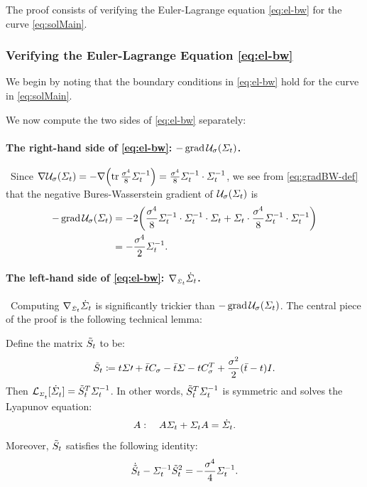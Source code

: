 The proof consists of verifying the Euler-Lagrange equation \eqref{eq:el-bw} for the curve \eqref{eq:solMain}.

\subsubsection{Verifying the Euler-Lagrange Equation \eqref{eq:el-bw}}
\label{sec:verifyEL}
We begin by noting that the boundary conditions in \eqref{eq:el-bw} hold for the curve in \eqref{eq:solMain}. 


We now compute the two sides of \eqref{eq:el-bw} separately:

\paragraph{The right-hand side of \eqref{eq:el-bw}: $-\gradBW\penergyBW$.}
~Since $\nabla \penergyBW = -\nabla \parens*{\tr \frac{\sdev^4}{8} \Sigcurveinv} =  \frac{\sdev^4}{8} \Sigcurveinv\cdot \Sigcurveinv$, we see from \eqref{eq:gradBW-def} that the negative Bures-Wasserstein gradient of $\penergyBW$ is
\begin{align}
\nn
-\gradBW \penergyBW &= -2\parens*{\frac{\sdev^4}{8} \Sigcurveinv\cdot \Sigcurveinv \cdot \Sigcurve + \Sigcurve\cdot \frac{\sdev^4}{8} \Sigcurveinv\cdot \Sigcurveinv } \\
\label{eq:gradBWU}
&= -\frac{\sdev^4}{2} \Sigcurveinv.
\end{align}


\paragraph{The left-hand side of \eqref{eq:el-bw}: $\nabla_{\scriptscriptstyle\dot{\Sigma}_{t}}\dot{\Sigma}_{t}$.}
~Computing $\nabla_{\scriptscriptstyle\dot{\Sigma}_{t}}\dot{\Sigma}_{t}$ is significantly trickier than $-\gradBW\penergyBW$. The central piece of the proof is the following technical lemma:
\begin{lemma}
\label{lem:lyap}
Define the matrix $\tilde{S}_{t}$ to be:
\begin{equation}
\label{eq:Ht}
\tilde{S}_{t} \coloneqq t\Sigma\prime + \bar{t} C_{\sigma} - \bar{t}\Sigma - tC_{\sigma}^T  + \frac{\sigma^2}{2}(\bar{t}-t)I.
\end{equation}Then $\lyap = \Ht^T  \Sigcurveinv$. In other words, $\tilde{S}_{t}^T  \Sigma^{-1}_{t}$ is symmetric and solves the Lyapunov equation:
\begin{equation}
  A: \quad  A\Sigma_{t} + \Sigma_{t} A= \dot{\Sigma}_{t}.
\end{equation}
Moreover, $\tilde{S}_{t}$ satisfies the following identity:
\begin{equation}
\label{eq:ht-id}
\dot{\tilde{S}}_{t} - \Sigma^{-1}_{t} \tilde{S}_{t}^2 =- \frac{\sigma^4}{4} \Sigma^{-1}_{t}.
\end{equation}

\end{lemma}


